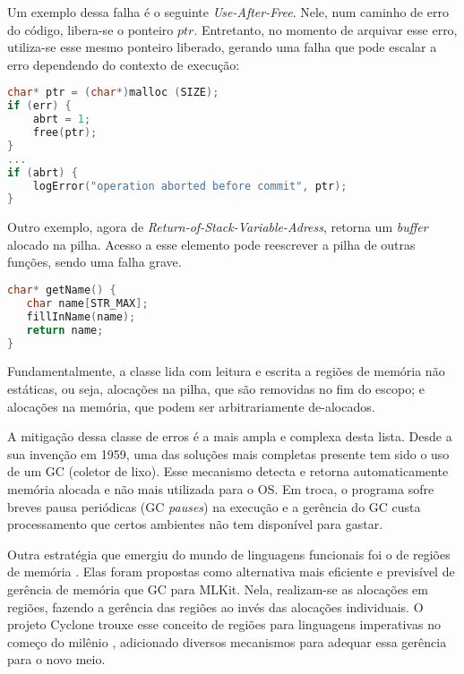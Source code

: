 Um exemplo dessa falha é o seguinte \emph{Use-After-Free}. Nele, num caminho de erro do código, libera-se o ponteiro $ptr$. Entretanto, no momento de arquivar esse erro, utiliza-se esse mesmo ponteiro liberado, gerando uma falha que pode escalar a erro dependendo do contexto de execução:
\begin{lstlisting}[language=C, label={lst:temporal-error-heap-c}, caption=Exemplo de uma Falha Temporal na \emph{Heap}]
char* ptr = (char*)malloc (SIZE);  
if (err) {
	abrt = 1;  
	free(ptr);
}  
...  
if (abrt) {
	logError("operation aborted before commit", ptr);
}
\end{lstlisting}

Outro exemplo, agora de \emph{Return-of-Stack-Variable-Adress}, retorna um \emph{buffer} alocado na pilha. Acesso a esse elemento pode reescrever a pilha de outras funções, sendo uma falha grave.

\begin{lstlisting}[language=C, label={lst:temporal-error-stack-c}, caption=Exemplo de uma Falha Temporal na Pilha]
char* getName() {
   char name[STR_MAX];  
   fillInName(name);  
   return name;
}
\end{lstlisting}

Fundamentalmente, a classe lida com leitura e escrita a regiões de memória não estáticas, ou seja, alocações na pilha, que são removidas no fim do escopo; e alocações na memória, que podem ser arbitrariamente de-alocados.


\label{sec:mem-error:GC}
A mitigação dessa classe de erros é a mais ampla e complexa desta lista. Desde a sua invenção em 1959, uma das soluções mais completas presente tem sido o uso de um GC (coletor de lixo). Esse mecanismo detecta e retorna automaticamente memória alocada e não mais utilizada para o OS. Em troca, o programa sofre breves pausa periódicas (GC \emph{pauses}) na execução e a gerência do GC custa processamento que certos ambientes não tem disponível para gastar.

\label{sec:mem-error:MemReg}
Outra estratégia que emergiu do mundo de linguagens funcionais foi o de regiões de memória \cite{REGMEM}. Elas foram propostas como alternativa mais eficiente e previsível de gerência de memória que GC para MLKit. Nela, realizam-se as alocações em regiões, fazendo a gerência das regiões ao invés das alocações individuais. O projeto Cyclone trouxe esse conceito de regiões para linguagens imperativas no começo do milênio \cite{CYCLONEMEM}, adicionado diversos mecanismos para adequar essa gerência para o novo meio.

